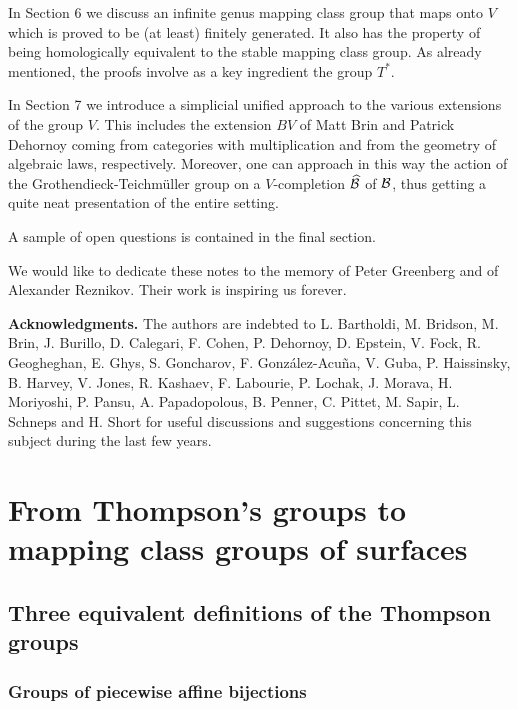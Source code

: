 \documentclass[twoside]{irmaems}
\theoremstyle{plain}
\theoremstyle{definition}
\theoremstyle{remark}
\newcommand{\B}{{{\cal B}}}
\begin{document}
\vspace{0.1cm}\noindent
In Section 6 we discuss an infinite genus mapping class group that maps onto $V$
which is proved to be (at least) finitely generated. It also has the property
of being homologically equivalent to the stable mapping class group. As already
mentioned, the proofs involve as a key ingredient the group $T^*$.

\vspace{0.1cm}\noindent
In Section 7 we introduce a simplicial unified approach to the various 
extensions of the group $V$. 
This includes the extension $BV$ of Matt Brin and Patrick Dehornoy 
coming from categories with multiplication and from the geometry of
algebraic laws, respectively.
Moreover, one can approach in this way the action of the 
Grothendieck-Teichm\"uller group on a $V$-completion $\widehat{\B}$ 
of $\B$, thus getting a quite neat presentation of the
entire setting.

\vspace{0.1cm}\noindent
A sample of open questions is contained in the final section.

\vspace{0.1cm}\noindent
We would like to dedicate these notes to the memory of Peter Greenberg and of
Alexander Reznikov. Their work is inspiring us forever.


\vspace{0.2cm}\noindent 
{\bf Acknowledgments.} The authors are indebted to L. Bartholdi,  
M. Bridson, M. Brin, J. Burillo, D. Calegari, F. Cohen, 
P. Dehornoy, D. Epstein, V. Fock, 
R. Geogheghan, E. Ghys, S. Goncharov, F. Gonz\'alez-Acu\~na,  
V. Guba,  P. Haissinsky, B. Harvey, V. Jones,  R. Kashaev, 
F. Labourie, P. Lochak, J. Morava,  H. Moriyoshi,   P. Pansu, A. Papadopolous, B. Penner, 
C. Pittet, M. Sapir, L. Schneps and H. Short for useful discussions and 
suggestions concerning this subject during the last few years.  



\section{From Thompson's groups to mapping class groups of surfaces}

   
\subsection{Three equivalent definitions of the Thompson groups}

\subsubsection*{Groups of piecewise affine bijections}
\end{document}
